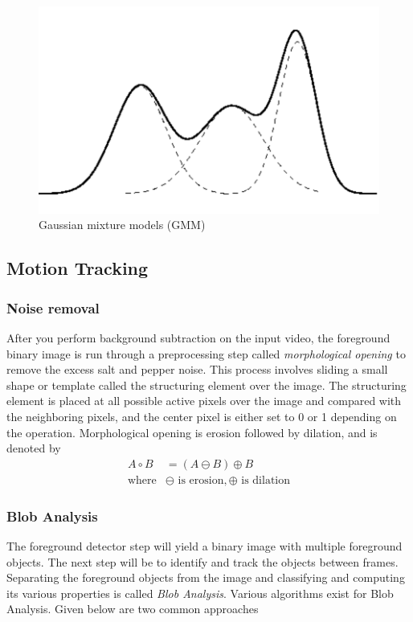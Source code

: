 \documentclass{article}
\begin{document}
	\begin{figure}[!h]
		\centering
		\includegraphics[scale = 0.3]{figures/gmm_graph.png}
		\caption{Gaussian mixture models (GMM)}
	\end{figure}

	\subsection{Motion Tracking}
	
	\subsubsection{Noise removal}
	After you perform background subtraction on the input video, the foreground binary image is run through a preprocessing step called \textit{morphological opening} to remove the excess salt and pepper noise. This process involves sliding a small shape or template called the structuring element over the image. The structuring element is placed at all possible active pixels over the image and compared with the neighboring pixels, and the center pixel is either set to 0 or 1 depending on the operation. Morphological opening is erosion followed by dilation, and is denoted by 
	\begin{align*}
		 A \circ B &= (A \ominus B) \oplus B \\ \text{where}& \ominus \text{ is erosion}, \oplus \text{ is dilation}
	\end{align*}
	
	\subsubsection{Blob Analysis}
	The foreground detector step will yield a binary image with multiple foreground objects. The next step will be to identify and track the objects between frames. Separating the foreground objects from the image and classifying and computing its various properties is called \textit{Blob Analysis}. Various algorithms exist for Blob Analysis. Given below are two common approaches
	
\end{document}
